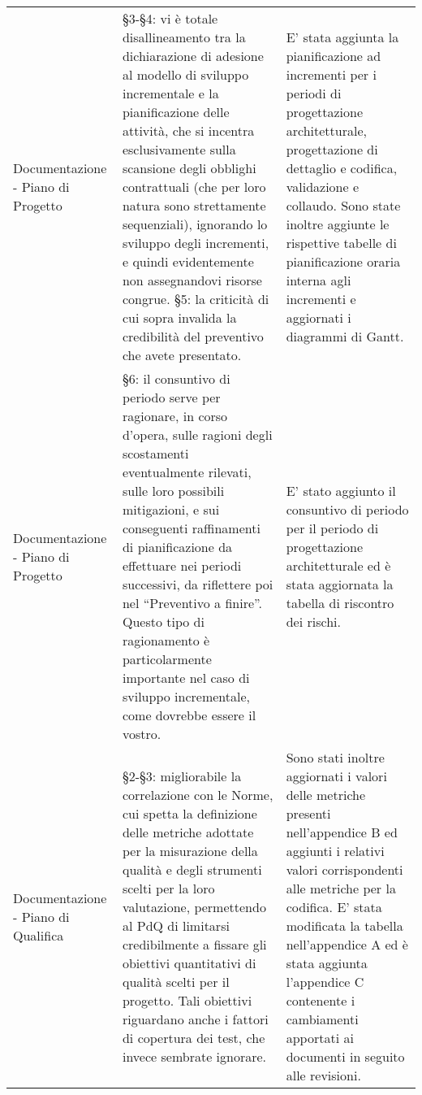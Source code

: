 \begin{longtable}{ 
				>{\centering}p{} 
				>{\centering}p{}
				>{\centering\arraybackslash}p{}}
				Documentazione - Piano di Progetto
					&
				§3-§4: vi è totale disallineamento tra la dichiarazione di adesione al modello di sviluppo incrementale e la pianificazione delle attività, che si incentra esclusivamente sulla scansione degli obblighi contrattuali (che per loro natura sono strettamente sequenziali), ignorando lo sviluppo degli incrementi, e quindi evidentemente non assegnandovi risorse congrue. §5: la criticità di cui sopra invalida la credibilità del preventivo che avete presentato.
					&
				E' stata aggiunta la pianificazione ad incrementi per i periodi di progettazione architetturale, progettazione di dettaglio e codifica, validazione e collaudo. Sono state inoltre aggiunte le rispettive tabelle di pianificazione oraria interna agli incrementi e aggiornati i diagrammi di Gantt.
					\\
			
				Documentazione - Piano di Progetto
					&
				 §6: il consuntivo di periodo serve per ragionare, in corso d’opera, sulle ragioni degli scostamenti eventualmente rilevati, sulle loro possibili mitigazioni, e sui conseguenti raffinamenti di pianificazione da  effettuare nei periodi successivi, da riflettere poi nel “Preventivo a finire”. Questo tipo di ragionamento è particolarmente importante nel caso di sviluppo incrementale, come dovrebbe essere il vostro.
					&
				E' stato aggiunto il consuntivo di periodo per il periodo di progettazione architetturale ed è stata aggiornata la tabella di riscontro dei rischi.
					\\
		 
				 Documentazione - Piano di Qualifica
					&
				§2-§3: migliorabile la correlazione con le Norme, cui spetta la definizione delle metriche adottate per la misurazione della qualità e degli strumenti scelti per la loro valutazione, permettendo al PdQ di limitarsi credibilmente a fissare gli obiettivi quantitativi di qualità scelti per il progetto. Tali obiettivi riguardano anche i fattori di copertura dei test, che invece sembrate ignorare.
					&
				Sono stati inoltre aggiornati i valori delle metriche presenti nell’appendice B ed aggiunti i relativi valori corrispondenti alle metriche per la codifica. E' stata modificata la tabella nell’appendice A ed è stata aggiunta l'appendice C contenente i cambiamenti apportati ai documenti in seguito alle revisioni.
					\\
			

\end{longtable}

